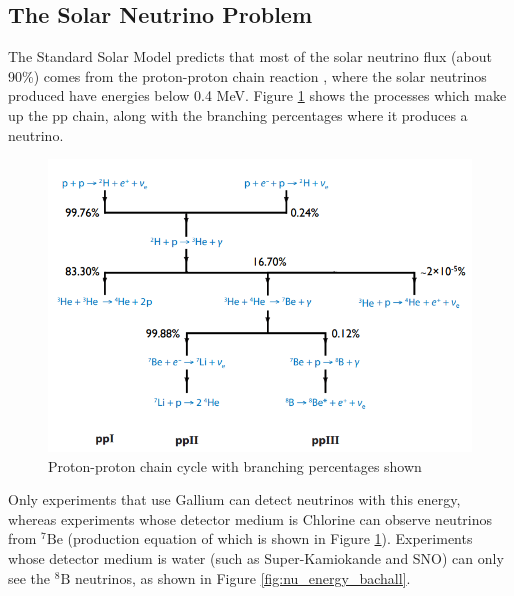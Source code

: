 \subsection{The Solar Neutrino Problem}

The Standard Solar Model predicts that most of the solar neutrino flux (about 90\%) comes from the proton-proton chain reaction \cite{borexino2018comprehensive}, where the solar neutrinos produced have energies below 0.4 MeV. Figure \ref{fig:ppchain} shows the processes which make up the pp chain, along with the branching percentages where it produces a neutrino. 

\begin{figure}
    \centering
    \includegraphics[width=\textwidth]{Figures/ppchain.png}
    \caption{Proton-proton chain cycle with branching percentages shown}
    \label{fig:ppchain}
\end{figure}

Only experiments that use Gallium can detect neutrinos with this energy, whereas experiments whose detector medium is Chlorine can observe neutrinos from ${ }^{7} \mathrm{Be}$ (production equation of which is shown in Figure \ref{fig:ppchain}). Experiments whose detector medium is water (such as Super-Kamiokande and SNO) can only see the ${ }^{8} \mathrm{B}$ neutrinos, as shown in Figure \ref{fig:nu_energy_bachall}.

